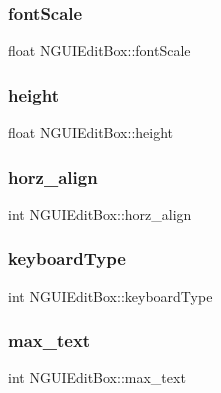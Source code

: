 \subsubsection{\texorpdfstring{font\+Scale}{fontScale}}
{\footnotesize\ttfamily float N\+G\+U\+I\+Edit\+Box\+::font\+Scale}

\hypertarget{class_n_g_u_i_edit_box_ac0067978b7561780d409ca95bf134458}{}\label{class_n_g_u_i_edit_box_ac0067978b7561780d409ca95bf134458} 
\subsubsection{\texorpdfstring{height}{height}}
{\footnotesize\ttfamily float N\+G\+U\+I\+Edit\+Box\+::height}

\hypertarget{class_n_g_u_i_edit_box_a883fb7fa746d81dadcca6cd2d210a84d}{}\label{class_n_g_u_i_edit_box_a883fb7fa746d81dadcca6cd2d210a84d} 
\subsubsection{\texorpdfstring{horz\+\_\+align}{horz\_align}}
{\footnotesize\ttfamily int N\+G\+U\+I\+Edit\+Box\+::horz\+\_\+align}

\hypertarget{class_n_g_u_i_edit_box_a3e33d881e86071236163f71ac32714c6}{}\label{class_n_g_u_i_edit_box_a3e33d881e86071236163f71ac32714c6} 
\subsubsection{\texorpdfstring{keyboard\+Type}{keyboardType}}
{\footnotesize\ttfamily int N\+G\+U\+I\+Edit\+Box\+::keyboard\+Type}

\hypertarget{class_n_g_u_i_edit_box_af367597013f224494b25a77c1bca615e}{}\label{class_n_g_u_i_edit_box_af367597013f224494b25a77c1bca615e} 
\subsubsection{\texorpdfstring{max\+\_\+text}{max\_text}}
{\footnotesize\ttfamily int N\+G\+U\+I\+Edit\+Box\+::max\+\_\+text}

